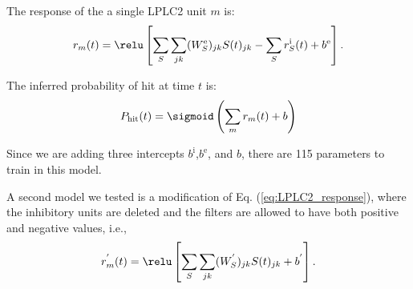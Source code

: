 The response of the a single LPLC2 unit $m$ is:
\begin{equation}
r_{m}(t) = \relu \left[ \sum_{S}\sum_{jk}(W^{\text{e}}_{S})_{jk}S(t)_{jk}-\sum_{S}r^{\text{i}}_{S}(t)+b^{\text{e}} \right].
\label{eq:LPLC2_response}
\end{equation}

The inferred probability of hit at time $t$ is:
\begin{equation}
P_{\text{hit}}(t) = \sigmoid \left( \sum_{m}r_{m}(t)+b \right)
\end{equation}

Since we are adding three intercepts $b^{\text{i}}$,$b^{\text{e}}$, and $b$, there are 115 parameters to train in this model.

A second model we tested is a modification of Eq. (\ref{eq:LPLC2_response}), where the inhibitory units are deleted and the filters are allowed to have both positive and negative values, i.e.,
\begin{equation}
r_{m}^{'}(t) = \relu \left[ \sum_{S}\sum_{jk}(W^{'}_{S})_{jk}S(t)_{jk}+b^{'} \right].
\label{eq:LPLC2_response_2}
\end{equation}





